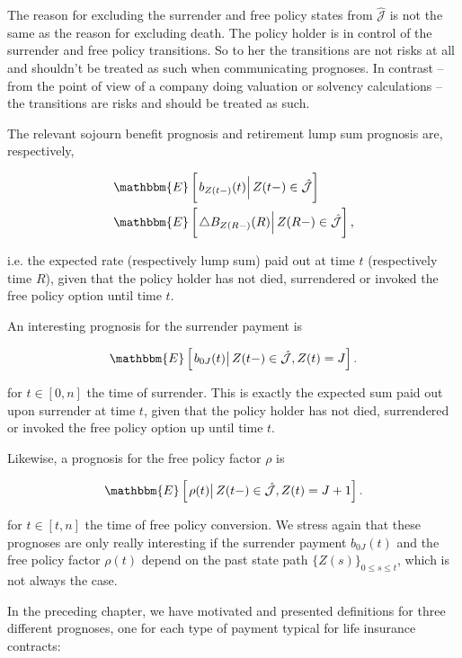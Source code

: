 \documentclass{article}
\newcommand{\1}[1]{\mathbbm{1}_{\left\lbrace #1 \right\rbrace}}
\newcommand{\econd}[2][def]{\mathbbm{E} \left[ \left. #1 \right| #2 \right]}
\theoremstyle{break}
\theoremstyle{remark}
\numberwithin{equation}{section}
\begin{document}
The reason for excluding the surrender and free policy states from $\hat{\mathcal{J}}$ is not the same as the reason for excluding death. The policy holder is in control of the surrender and free policy transitions. So to her the transitions are not risks at all and shouldn't be treated as such when communicating prognoses. In contrast -- from the point of view of a company doing valuation or solvency calculations -- the transitions are risks and should be treated as such.

The relevant sojourn benefit prognosis and retirement lump sum prognosis are, respectively, 

\begin{align*}
&\econd[b_{Z(t-)}(t)]{Z(t-) \in \hat{\mathcal{J}}} \\
&\econd[\triangle B_{Z(R-)}(R)]{Z(R-) \in \hat{\mathcal{J}}},
\end{align*}

i.e. the expected rate (respectively lump sum) paid out at time $t$ (respectively time $R$), given that the policy holder has not died, surrendered or invoked the free policy option until time $t$.

An interesting prognosis for the surrender payment is

\begin{align*}
\econd[b_{0J}(t)]{Z(t-) \in \hat{\mathcal{J}}, Z(t)=J}.
\end{align*}

for $t \in [0,n]$ the time of surrender. This is exactly the expected sum paid out upon surrender at time $t$, given that the policy holder has not died, surrendered or invoked the free policy option up until time $t$.

Likewise, a prognosis for the free policy factor $\rho$ is

\begin{align*}
\econd[\rho(t)]{Z(t-) \in \hat{\mathcal{J}}, Z(t)=J+1}.
\end{align*}

for $t \in [t,n]$ the time of free policy conversion. We stress again that these prognoses are only really interesting if the surrender payment $b_{0J}(t)$ and the free policy factor $\rho(t)$ depend on the past state path $\{ Z(s) \}_{0 \leq s \leq t}$, which is not always the case.

\bigbreak
\bigbreak
\bigbreak

In the preceding chapter, we have motivated and presented definitions for three different prognoses, one for each type of payment typical for life insurance contracts:
\end{document}
